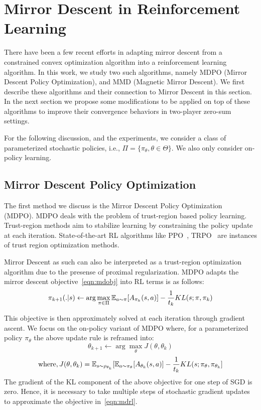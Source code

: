 \chapter{Mirror Descent in Reinforcement Learning} 

There have been a few recent efforts in adapting mirror descent from a constrained convex optimization 
algorithm into a reinforcement learning algorithm.
In this work, we study two such algorithms, namely MDPO (Mirror Descent Policy
Optimization), and MMD (Magnetic Mirror Descent).
We first describe these algorithms and their connection to Mirror Descent in this section.
In the next section we propose some modifications to be applied on top of these algorithms 
to improve their convergence behaviors in two-player zero-sum settings.

For the following discussion, and the experiments, we consider a class of parameterized stochastic policies, 
i.e., $\Pi = \{\pi_{\theta}, \theta \in \Theta\}$.
We also only consider on-policy learning.


\section[MDPO]{Mirror Descent Policy Optimization}

The first method we discuss is the Mirror Descent Policy Optimization~\cite{tomarMirror2022} (MDPO). 
MDPO deals with the problem of trust-region based policy learning. 
Trust-region methods aim to stabilize learning by constraining the policy update at each iteration.
State-of-the-art RL algorithms like PPO~\cite{schulmanProximal2017}, TRPO~\cite{schulmanTrust2015} are instances of trust region
optimization methods.

Mirror Descent as such can also be interpreted as a trust-region optimization algorithm due to the presense of 
proximal regularization.
MDPO adapts the mirror descent objective~\ref{eqn:mdobj} into RL terms is as follows:
\begin{equation}\label{eqn:mdrl}
	\pi_{k+1}(.|s) \leftarrow \arg\max_{\pi \in \Pi} \mathbb{E}_{a \sim \pi} [A_{\pi_k}(s,a)] - \frac{1}{t_k} KL(s; \pi, \pi_k) 	
\end{equation}

This objective is then approximately solved at each iteration through gradient ascent.
We focus on the on-policy variant of MDPO where, for a parameterized policy $\pi_{\theta}$ 
the above update rule is reframed into:
$$\theta_{k+1} \leftarrow \arg\max_{\theta} J(\theta, \theta_k)$$
$$\text{where}, J(\theta, \theta_k) = \mathbb{E}_{s \sim \rho_{\theta_k}} [ \mathbb{E}_{a \sim \pi_\theta}[A_{\theta_k}(s,a)] - \frac{1}{t_k} KL(s; \pi_\theta, \pi_{\theta_k}]$$
The gradient of the KL component of the above objective for one step of SGD is zero. Hence, it is necessary to 
take multiple steps of stochastic gradient updates to approximate the objective in~\ref{eqn:mdrl}.

